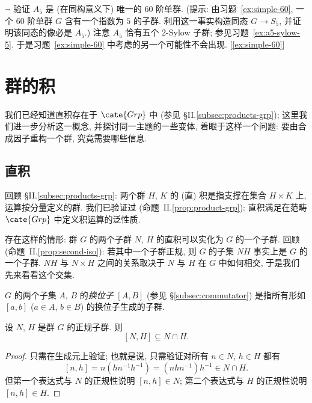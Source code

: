 \begin{prob}
\label{ex:unique-simple-60}
$\neg$ 验证 $A_5$ 是 (在同构意义下) 唯一的 $60$ 阶单群. (提示: 由习题~\ref{ex:simple-60}, 一个 $60$ 阶单群 $G$ 含有一个指数为 $5$ 的子群. 利用这一事实构造同态 $G \to S_5$, 并证明该同态的像必是 $A_5$.) 注意 $A_5$ 恰有五个 $2$-Sylow 子群; 参见习题~\ref{ex:a5-sylow-5}. 于是习题~\ref{ex:simple-60} 中考虑的另一个可能性不会出现. [\ref{ex:simple-60}]
\end{prob}

\section{群的积}
\label{sec:products-of-groups}

我们已经知道直积存在于 $\cate{Grp}$ 中 (参见 \S II.\ref{subsec:products-grp}); 这里我们进一步分析这一概念, 并探讨同一主题的一些变体, 着眼于这样一个问题: 要由合成因子重构一个群, 究竟需要哪些信息.

\subsection{直积}
\label{subsec:direct-product}

回顾 \S II.\ref{subsec:products-grp}: 两个群 $H$, $K$ 的 (直) 积是指支撑在集合 $H \times K$ 上, 运算按分量定义的群. 我们已验证过 (命题~II.\ref{prop:product-grp}): 直积满足在范畴 $\cate{Grp}$ 中定义积运算的泛性质.

存在这样的情形: 群 $G$ 的两个子群 $N$, $H$ 的直积可以实化为 $G$ 的一个子群. 回顾 (命题~II.\ref{prop:second-iso}): 若其中一个子群正规, 则 $G$ 的子集 $NH$ 事实上是 $G$ 的一个子群. $NH$ 与 $N \times H$ 之间的关系取决于 $N$ 与 $H$ 在 $G$ 中如何相交, 于是我们先来看看这个交集.

$G$ 的两个子集 $A$, $B$ 的\emph{换位子}%
$[A, B]$ (参见 \S\ref{subsec:commutator}) 是指所有形如 $[a, b]$ ($a \in A$, $b \in B$) 的换位子生成的子群.

\begin{lemma}
\label{lem:commutator-subset}
设 $N$, $H$ 是群 $G$ 的正规子群. 则
\[
[N, H] \subseteq N \cap H.
\]
\end{lemma}

\begin{proof}
只需在生成元上验证; 也就是说, 只需验证对所有 $n \in N$, $h \in H$ 都有
\[
[n, h] = n(h n^{-1} h^{-1}) = (n h n^{-1}) h^{-1} \in N \cap H.
\]
但第一个表达式与 $N$ 的正规性说明 $[n, h] \in N$; 第二个表达式与 $H$ 的正规性说明 $[n, h] \in H$.
\end{proof}

